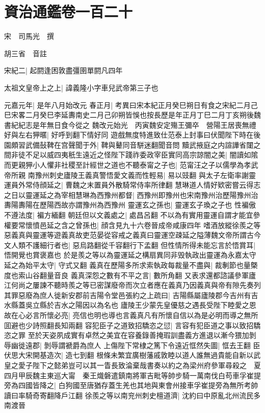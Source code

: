 \chapter{資治通鑑卷一百二十}
宋　司馬光　撰

胡三省　音註

宋紀二|{
	起閼逢困敦盡彊圉單閼凡四年}


太祖文皇帝上之上|{
	諱義隆小字車兒武帝第三子也}


元嘉元年|{
	是年八月始改元}
春正月|{
	考異曰宋本紀正月癸巳朔日有食之宋紀二月己巳宋畧二月癸巳李延夀南史二月己卯朔皆悞也按長歷是年正月丁巳二月丁亥朔後魏書紀紀志是年無日食今從之}
魏改元始光　丙寅魏安定殤王彌卒　營陽王居喪無禮好與左右狎暱|{
	好呼到翻下情好同}
遊戲無度特進致仕范泰上封事曰伏聞陛下時在後園頗習武備鼔鞞在宫聲聞于外|{
	鞞與鼙同音駢迷翻聞音問}
黷武掖庭之内諠譁省闥之間非徒不足以威四夷秖生遠近之怪陛下踐祚委政宰臣實同高宗諒闇之美|{
	闇讀如隂}
而更親狎小人懼非社稷至計經世之道也不聽泰甯之子也|{
	范甯汪之子以儒學為孝武帝所親}
南豫州刺史廬陵王義真警悟愛文義而性輕易|{
	易以豉翻}
與太子左衛率謝靈運員外常侍顔延之|{
	曹魏之末置員外散騎常侍率所律翻}
慧琳道人情好欵密嘗云得志之日以靈運延之為宰相慧琳為西豫州都督|{
	西豫州即豫州也宋南豫州治歷陽豫州治夀陽夀陽在歷陽西故亦謂豫州為西豫州}
靈運玄之孫也|{
	靈運玄子瑍之子也}
性褊傲不遵法度|{
	褊方緬翻}
朝廷但以文義處之|{
	處昌呂翻}
不以為有實用靈運自謂才能宜參權要常懷憤邑延之含之曾孫也|{
	顔含見九十六卷晉成帝咸康四年}
嗜酒放縱徐羨之等惡義真與靈運等遊義真故吏范晏從容戒之義真曰靈運空疎延之隘薄魏文帝所謂古今文人類不護細行者也|{
	惡烏路翻從千容翻行下孟翻}
但性情所得未能忘言於悟賞耳|{
	悟開覺也賞褒嘉也}
於是羨之等以為靈運延之構扇異同非毁執政出靈運為永嘉太守延之為始平太守|{
	守式又翻}
義真在歷陽多所求索執政每裁量不盡與|{
	裁剸節也量槩度也索山谷翻量音良}
義真深怨之數有不平之言|{
	數所角翻}
又表求還都諮議參軍廬江何尚之屢諫不聽時羨之等已密謀廢帝而次立者應在義真乃因義真與帝有隙先奏列其罪惡廢為庶人徙新安郡前吉陽令堂邑張約之上疏曰|{
	吉陽縣屬廬陵郡今吉州有吉水縣蓋吳立縣於吉水之陽因以為名也}
廬陵王少蒙先皇優慈之遇長受陛下睦愛之恩故在心必言所懷必亮|{
	亮信也明也導也言義真凡有所懷自信以為是必明而導之無所囬避也少詩照翻長知兩翻}
容犯臣子之道致招驕恣之愆|{
	言容有犯臣道之事以致招驕恣之罪}
至於天姿夙成實有卓然之美宜在容養錄善掩瑕訓盡義方進退以漸今猥加剝辱幽徙遠郡|{
	剝辱謂褫爵為庶人}
上傷陛下常棣之篤下令遠近恇然失圖|{
	恇去王翻}
臣伏思大宋開基造次|{
	造七到翻}
根條未繁宜廣樹藩戚敦睦以道人誰無過貴能自新以武皇之愛子陛下之懿弟豈可以其一眚長致淪棄哉書奏以約之為梁州府參軍尋殺之　夏四月甲辰魏主東巡大甯　秦王熾磐遣鎮南將軍吉毗等帥步騎一萬南伐白苟車孚崔提旁為四國皆降之|{
	白狗國至唐猶存蓋生羌也其地與東會州接車孚崔提旁為無所考帥讀曰率騎奇寄翻降戶江翻}
徐羨之等以南兖州刺史檀道濟|{
	沈約曰中原亂北州流民多南渡晉}


